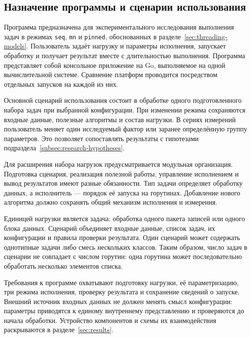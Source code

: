 \subsection{Назначение программы и сценарии использования}
\label{subsec:program-purpose}

Программа предназначена для экспериментального исследования выполнения задач в режимах
  \texttt{seq}, \texttt{mn} и \texttt{pinned}, обоснованных в разделе~\ref{sec:threading-models}.
  Пользователь задаёт нагрузку и параметры исполнения, запускает обработку и получает результат
  вместе с длительностью выполнения. Программа представляет собой консольное приложение на Go,
  выполняемое на одной вычислительной системе. Сравнение платформ проводится посредством отдельных
  запусков на каждой из них.

Основной сценарий использования состоит в обработке одного подготовленного набора задач при
  выбранной конфигурации. При изменении режима сохраняются входные данные, полезные алгоритмы
  и состав нагрузки. В сериях измерений пользователь меняет один исследуемый фактор или заранее
  определённую группу параметров. Это позволяет сопоставлять результаты с гипотезами
  подраздела~\ref{subsec:research-hypotheses}.

Для расширения набора нагрузок предусматривается модульная организация. Подготовка сценария,
  реализация полезной работы, управление исполнением и вывод результатов имеют разные обязанности.
  Тип задачи определяет обработку данных, а исполнитель — порядок её запуска на горутинах.
  Добавление нового алгоритма должно сохранять общий механизм исполнения и измерения.

Единицей нагрузки является задача: обработка одного пакета записей или одного блока данных.
  Сценарий объединяет входные данные, список задач, их конфигурации и правила проверки результата.
  Один сценарий может содержать однотипные задачи либо смесь нескольких классов. Таким образом,
  число задач в сценарии не совпадает с числом горутин: одна горутина может последовательно
  обработать несколько элементов списка.

Требования к программе охватывают подготовку нагрузки, её параметризацию, три режима исполнения,
  проверку результата и сохранение сведений о запуске. Внешний источник входных данных не должен
  менять смысл конфигурации: параметры приводятся к единому внутреннему представлению и проверяются
  до начала обработки. Устройство компонентов и схемы их взаимодействия раскрываются
  в разделе~\ref{sec:results}.

